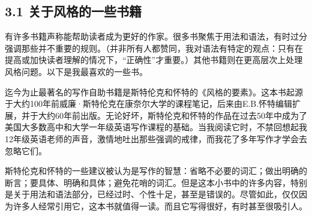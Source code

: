 \subsection*{3.1 关于风格的一些书籍}
有许多书籍声称能帮助读者成为更好的作家。很多书聚焦于用法和语法，有时过分强调那些并不重要的规则。（并非所有人都赞同，我对语法有特定的观点：只有在提高或加快读者理解的情况下，“正确性”才重要。）其他书籍则在更高层次上处理风格问题。以下是我最喜欢的一些书。

迄今为止最著名的写作自助书籍是斯特伦克和怀特的《风格的要素》。这本书起源于大约100年前威廉·斯特伦克在康奈尔大学的课程笔记，后来由E.B.怀特编辑扩展，并于大约60年前出版。无论好坏，斯特伦克和怀特的作品在过去50年中成为了美国大多数高中和大学一年级英语写作课程的基础。当我阅读它时，不禁回想起我12年级英语老师的声音，激情地吐出那些强调的戒律，而我花了多年写作才学会去忽略它们。

斯特伦克和怀特的一些建议被认为是写作的智慧：省略不必要的词汇；做出明确的断言；要具体、明确和具体；避免花哨的词汇。但是这本小书中的许多内容，特别是关于用法和语法部分，已经过时、个性十足，甚至是错误的。尽管如此，仅仅因为许多人经常引用它，这本书就值得一读。而且它写得很好，有时甚至很吸引人。

